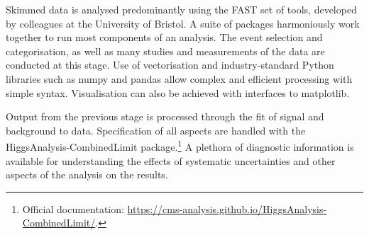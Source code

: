 Skimmed data is analysed predominantly using the FAST set of tools, developed by colleagues at the University of Bristol. A suite of packages harmoniously work together to run most components of an analysis. The event selection and categorisation, as well as many studies and measurements of the data are conducted at this stage. Use of vectorisation and industry-standard Python libraries such as \textsf{numpy} and \textsf{pandas} allow complex and efficient processing with simple syntax. Visualisation can also be achieved with interfaces to \textsf{matplotlib}.

Output from the previous stage is processed through the fit of signal and background to data. Specification of all aspects are handled with the \textsf{HiggsAnalysis-CombinedLimit} package.\footnote{Official documentation: \url{https://cms-analysis.github.io/HiggsAnalysis-CombinedLimit/}.} A plethora of diagnostic information is available for understanding the effects of systematic uncertainties and other aspects of the analysis on the results.
